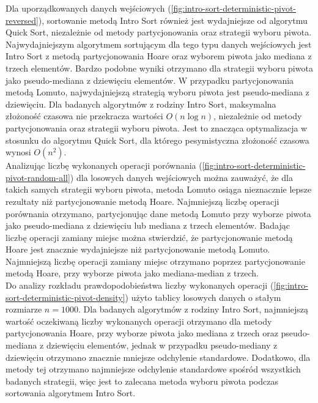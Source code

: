 Dla uporządkowanych danych wejściowych (\ref{fig:intro-sort-deterministic-pivot-reversed}), sortowanie metodą Intro Sort również jest wydajniejsze od algorytmu Quick Sort, niezależnie od metody partycjonowania oraz strategii wyboru piwota. Najwydajniejszym algorytmem sortującym dla tego typu danych wejściowych jest Intro Sort z metodą partycjonowania Hoare oraz wyborem piwota jako mediana z trzech elementów. Bardzo podobne wyniki otrzymano dla strategii wyboru piwota jako pseudo-mediana z dziewięciu elementów. W przypadku partycjonowania metodą Lomuto, najwydajniejszą strategią wyboru piwota jest pseudo-mediana z dziewięciu. Dla badanych algorytmów z rodziny Intro Sort, maksymalna złożoność czasowa nie przekracza wartości $O(n\log{n})$, niezależnie od metody partycjonowania oraz strategii wyboru piwota. Jest to znacząca optymalizacja w stosunku do algorytmu Quick Sort, dla którego pesymistyczna złożoność czasowa wynosi $O(n^2)$.\\

Analizując liczbę wykonanych operacji porównania (\ref{fig:intro-sort-deterministic-pivot-random-all}) dla losowych danych wejściowych można zauważyć, że dla takich samych strategii wyboru piwota, metoda Lomuto osiąga nieznacznie lepsze rezultaty niż partycjonowanie metodą Hoare. Najmniejszą liczbę operacji porównania otrzymano, partycjonując dane metodą Lomuto przy wyborze piwota jako pseudo-mediana z dziewięciu lub mediana z trzech elementów. Badając liczbę operacji zamiany miejsc można stwierdzić, że partycjonowanie metodą Hoare jest znacznie wydajniejsze niż partycjonowanie metodą Lomuto. Najmniejszą liczbę operacji zamiany miejsc otrzymano poprzez partycjonowanie metodą Hoare, przy wyborze piwota jako mediana-median z trzech.\\

Do analizy rozkładu prawdopodobieństwa liczby wykonanych operacji (\ref{fig:intro-sort-deterministic-pivot-density}) użyto tablicy losowych danych o stałym rozmiarze $n = 1000$. Dla badanych algorytmów z rodziny Intro Sort, najmniejszą wartość oczekiwaną liczby wykonanych operacji otrzymano dla metody partycjonowania Hoare, przy wyborze piwota jako mediana z trzech oraz pseudo-mediana z dziewięciu elementów, jednak w przypadku pseudo-mediany z dziewięciu otrzymano znacznie mniejsze odchylenie standardowe. Dodatkowo, dla metody tej otrzymano najmniejsze odchylenie standardowe spośród wszystkich badanych strategii, więc jest to zalecana metoda wyboru piwota podczas sortowania algorytmem Intro Sort.\\

